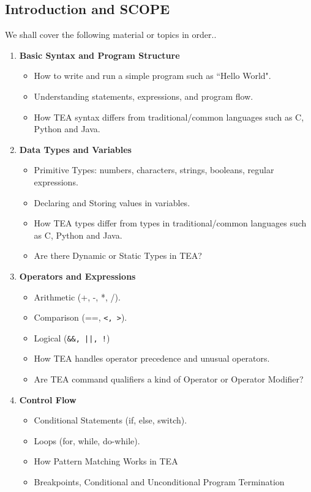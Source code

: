 \documentclass[a4paper, 18pt]{book} %
\begin{document}
{{{\begin{appendices}
\vspace{2em}

\section{Introduction and SCOPE}

We shall cover the following material or topics in order..

\begin{enumerate}

\item{\textbf{Basic Syntax and Program Structure}
\begin{itemize}
\item How to write and run a simple program such as ``Hello World".
\item Understanding statements, expressions, and program flow.
\item How TEA syntax differs from traditional/common languages such as C, Python and Java.
\end{itemize}
}

\item{\textbf{Data Types and Variables}
\begin{itemize}
\item Primitive Types: numbers, characters, strings, booleans, regular expressions.
\item Declaring and Storing values in variables.
\item How TEA types differ from types in traditional/common languages such as C, Python and Java.
\item Are there Dynamic or Static Types in TEA?
\end{itemize}
}


\item{\textbf{Operators and Expressions}
\begin{itemize}
\item Arithmetic (+, -, *, /).
\item Comparison (==, \verb!<, >!).
\item Logical (\verb:&&, ||, !:)
\item How TEA handles operator precedence and unusual operators.
\item Are TEA command qualifiers a kind of Operator or Operator Modifier?
\end{itemize}
}


\item{\textbf{Control Flow}
\begin{itemize}
\item Conditional Statements (if, else, switch).
\item Loops (for, while, do-while).
\item How Pattern Matching Works in TEA
\item Breakpoints, Conditional and Unconditional Program Termination
\end{itemize}
}



\end{enumerate}
\end{appendices}}}}
\end{document}

